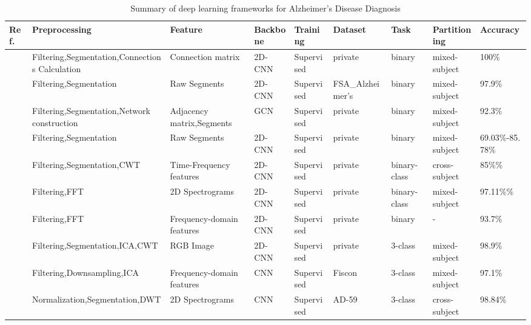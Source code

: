 \begin{table*}[ht]
\renewcommand{\arraystretch}{1.2}
\caption{Summary of deep learning frameworks for Alzheimer's Disease Diagnosis}
\label{tab:ads}
\footnotesize
\begin{tabular}{p{0.4cm}p{2.8cm}p{2cm}p{1.5cm}p{1.9cm}p{1.9cm}p{0.8cm}p{1.8cm}p{2cm}}
\hline
\textbf{Ref.} & \textbf{Preprocessing} & \textbf{Feature} & \textbf{Backbone} & \textbf{Training} & \textbf{Dataset} & \textbf{Task} & \textbf{Partitioning} & \textbf{Accuracy} \\
\hline
~\cite{AD1} & Filtering,Segmentation,\newline Connections Calculation & Connection \newline matrix & 2D-CNN & Supervised & private & binary & mixed-subject & 100\% \\
~\cite{AD2} & Filtering,Segmentation & Raw Segments & 2D-CNN & Supervised & FSA\_Alzheimer’s & binary & mixed-subject & 97.9\% \\
~\cite{shan2022spatial} & Filtering,Segmentation,\newline Network construction & Adjacency matrix,Segments & GCN & Supervised & private & binary & mixed-subject & 92.3\% \\
~\cite{AD4} & Filtering,Segmentation & Raw Segments & 2D-CNN & Supervised & private & binary & mixed-subject & 69.03\%-85.78\% \\
~\cite{AD5} & Filtering,Segmentation,\newline CWT & Time-Frequency features & 2D-CNN & Supervised & private & binary\newline 3-class & cross-subject & 85\%\newline82\% \\
~\cite{AD6} & Filtering,FFT & 2D Spectrograms & 2D-CNN & Supervised & private & binary\newline 3-class & mixed-subject & 97.11\%\newline95.04\% \\
~\cite{AD7} & Filtering,FFT & Frequency-domain features & 2D-CNN & Supervised & private & binary& - & 93.7\% \\
~\cite{AD8} & Filtering,Segmentation,\newline ICA,CWT & RGB Image & 2D-CNN & Supervised & private & 3-class & mixed-subject & 98.9\% \\
~\cite{AD9} & Filtering,Downsampling,\newline ICA & Frequency-domain features & CNN & Supervised & Fiscon & 3-class & mixed-subject & 97.1\% \\
~\cite{AD10} & Normalization,\newline Segmentation,DWT & 2D Spectrograms & CNN & Supervised & AD-59 & 3-class & cross-subject & 98.84\% \\

\end{tabular}
\end{table*}
